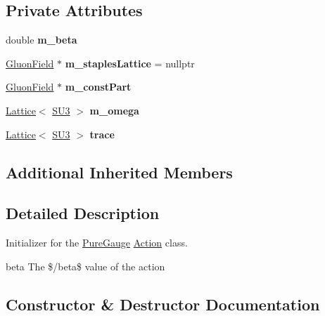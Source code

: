 \subsection*{Private Attributes}
\begin{DoxyCompactItemize}
\item 
double {\bfseries m\+\_\+beta}\hypertarget{classPureGauge_afc5d5fd50c90502b1851f7fa7295e68d}{}\label{classPureGauge_afc5d5fd50c90502b1851f7fa7295e68d}

\item 
\hyperlink{classField}{Gluon\+Field} $\ast$ {\bfseries m\+\_\+staples\+Lattice} = nullptr\hypertarget{classPureGauge_ae2b14c7d0c1e2f5cb070b9d8ed9ab237}{}\label{classPureGauge_ae2b14c7d0c1e2f5cb070b9d8ed9ab237}

\item 
\hyperlink{classField}{Gluon\+Field} $\ast$ {\bfseries m\+\_\+const\+Part}\hypertarget{classPureGauge_ae120c791a7462c26995eebc902a2ae2a}{}\label{classPureGauge_ae120c791a7462c26995eebc902a2ae2a}

\item 
\hyperlink{classLattice}{Lattice}$<$ \hyperlink{structSU3}{S\+U3} $>$ {\bfseries m\+\_\+omega}\hypertarget{classPureGauge_a1a70fe500b7f005c0e82da6b7c5f3509}{}\label{classPureGauge_a1a70fe500b7f005c0e82da6b7c5f3509}

\item 
\hyperlink{classLattice}{Lattice}$<$ \hyperlink{structSU3}{S\+U3} $>$ {\bfseries trace}\hypertarget{classPureGauge_abbe94c552df9ba24ba63377189af9f24}{}\label{classPureGauge_abbe94c552df9ba24ba63377189af9f24}

\end{DoxyCompactItemize}
\subsection*{Additional Inherited Members}


\subsection{Detailed Description}
Initializer for the \hyperlink{classPureGauge}{Pure\+Gauge} \hyperlink{classAction}{Action} class. 

beta The \$/beta\$ value of the action 

\subsection{Constructor \& Destructor Documentation}
